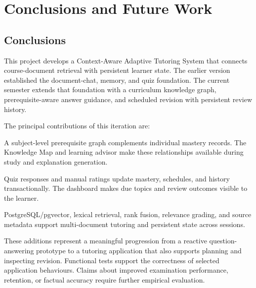 \documentclass[11pt, a4paper, oneside]{report}
\begin{document}
\chapter{Conclusions and Future Work}

\section{Conclusions}
This project develops a Context-Aware Adaptive Tutoring System that connects course-document retrieval with persistent learner state. The earlier version established the document-chat, memory, and quiz foundation. The current semester extends that foundation with a curriculum knowledge graph, prerequisite-aware answer guidance, and scheduled revision with persistent review history.

The principal contributions of this iteration are:
\begin{description}[leftmargin=3em, itemsep=6pt]
  \item[Curriculum-Aware Personalisation.] A subject-level prerequisite graph complements individual mastery records. The Knowledge Map and learning advisor make these relationships available during study and explanation generation.
  \item[An Inspectable Review Loop.] Quiz responses and manual ratings update mastery, schedules, and history transactionally. The dashboard makes due topics and review outcomes visible to the learner.
  \item[Improved Retrieval and Persistence.] PostgreSQL/pgvector, lexical retrieval, rank fusion, relevance grading, and source metadata support multi-document tutoring and persistent state across sessions.
\end{description}

These additions represent a meaningful progression from a reactive question-answering prototype to a tutoring application that also supports planning and inspecting revision. Functional tests support the correctness of selected application behaviours. Claims about improved examination performance, retention, or factual accuracy require further empirical evaluation.
\end{document}
